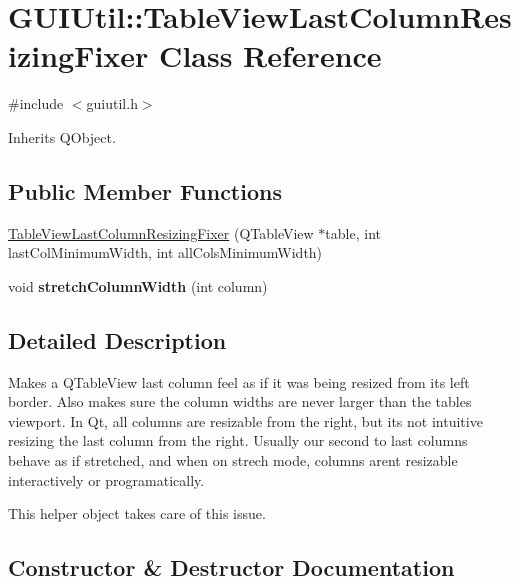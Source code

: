 \hypertarget{class_g_u_i_util_1_1_table_view_last_column_resizing_fixer}{}\section{G\+U\+I\+Util\+::Table\+View\+Last\+Column\+Resizing\+Fixer Class Reference}
\label{class_g_u_i_util_1_1_table_view_last_column_resizing_fixer}


{\ttfamily \#include $<$guiutil.\+h$>$}



Inherits Q\+Object.

\subsection*{Public Member Functions}
\begin{DoxyCompactItemize}
\item 
\mbox{\hyperlink{class_g_u_i_util_1_1_table_view_last_column_resizing_fixer_a25687ab7a88da518b48d7355dc9aa22d}{Table\+View\+Last\+Column\+Resizing\+Fixer}} (Q\+Table\+View $\ast$table, int last\+Col\+Minimum\+Width, int all\+Cols\+Minimum\+Width)
\item 
\mbox{\label{class_g_u_i_util_1_1_table_view_last_column_resizing_fixer_a89971ed347cf9d25e02cfb7d9c7e3ca6}} 
void {\bfseries stretch\+Column\+Width} (int column)
\end{DoxyCompactItemize}


\subsection{Detailed Description}
Makes a Q\+Table\+View last column feel as if it was being resized from its left border. Also makes sure the column widths are never larger than the table\textquotesingle{}s viewport. In Qt, all columns are resizable from the right, but it\textquotesingle{}s not intuitive resizing the last column from the right. Usually our second to last columns behave as if stretched, and when on strech mode, columns aren\textquotesingle{}t resizable interactively or programatically.

This helper object takes care of this issue. 

\subsection{Constructor \& Destructor Documentation}
\mbox{\label{class_g_u_i_util_1_1_table_view_last_column_resizing_fixer_a25687ab7a88da518b48d7355dc9aa22d}} 
